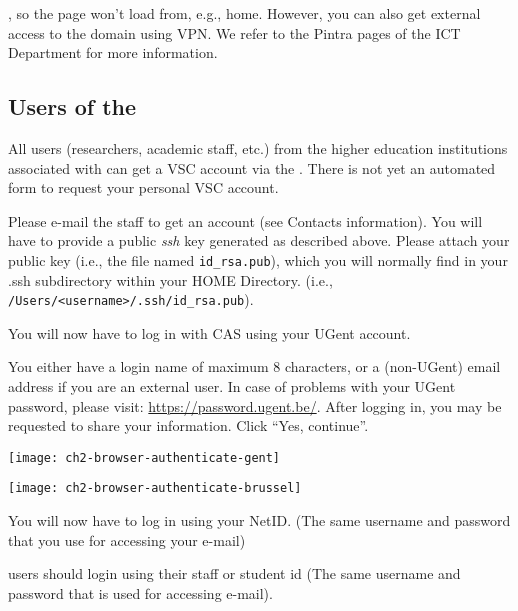 , so the page won't load from, e.g., home. However, you can also get
external access to the \university domain using VPN. We refer to the Pintra
pages of the ICT Department
for more information.

\subsection{Users of the \association}
\label{sec:users-of-association}

All users (researchers, academic staff, etc.) from the higher education
institutions associated with \university can get a VSC account via the \university. There is not
yet an automated form to request your personal VSC account.

Please e-mail the \hpc staff to get an account (see Contacts information).
You will have to provide a public \emph{ssh} key generated as described
above. Please attach your public key (i.e., the file named \lstinline|id_rsa.pub|),
which you will normally find in your .ssh subdirectory within your HOME
Directory. (i.e., \lstinline|/Users/<username>/.ssh/id_rsa.pub|).


\fi %

\ifgent
  You will now have to log in with CAS using your UGent account.

  You either have a
  login name of maximum 8 characters, or a (non-UGent) email address if you are an external
  user. In case of problems with your UGent password, please visit:
  \url{https://password.ugent.be/}. After logging in, you may be requested
  to share your information. Click ``Yes, continue''.
  \begin{center}
  \texttt{[image: ch2-browser-authenticate-gent]}
  \end{center}
\fi

\ifbrussel
  \begin{center}
  \texttt{[image: ch2-browser-authenticate-brussel]}
  \end{center}

  You will now have to log in using your NetID. (The same username and password that you use for accessing your e-mail)

\fi

\ifleuven
\hpc users should login using their staff or student id
(The same username and password that is used for accessing e-mail).

